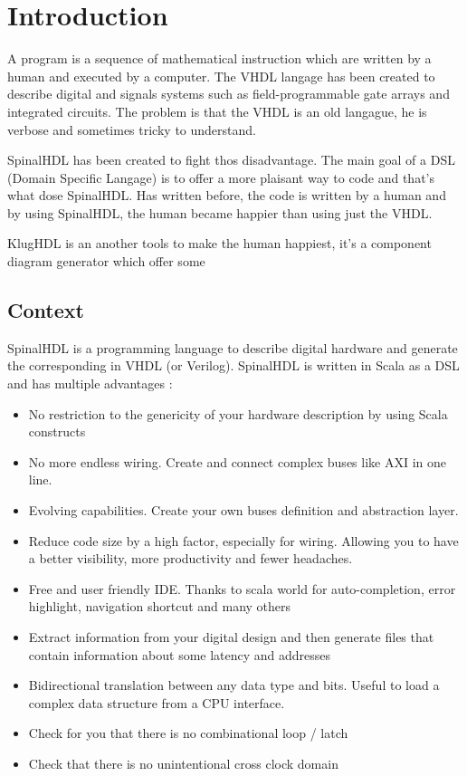 \chapter{Introduction} %
\label{cha:Introduction}

A program is a sequence of mathematical instruction which are written by a human and executed by a computer.
The VHDL langage has been created to describe digital and signals systems such as field-programmable gate arrays and integrated circuits\cite{wiki-vhdl}. The problem is that the VHDL is an old langague, he is verbose and sometimes tricky to understand.

SpinalHDL has been created to fight thos disadvantage. The main goal of a DSL (Domain Specific Langage) is to offer a more plaisant way to code and that's what dose SpinalHDL. Has written before, the code is written by a human and by using SpinalHDL, the human became happier than using just the VHDL.

KlugHDL is an another tools to make the human happiest, it's a component diagram generator which offer some

\section{Context} %
\label{sec:Context}

SpinalHDL is a programming language to describe digital hardware and generate the corresponding in VHDL (or Verilog). SpinalHDL is written in Scala as a DSL and has multiple advantages\cite{github-spinalhdl} :
\begin{itemize}
    \item No restriction to the genericity of your hardware description by using Scala constructs
    \item No more endless wiring. Create and connect complex buses like AXI in one line.
    \item Evolving capabilities. Create your own buses definition and abstraction layer.
    \item Reduce code size by a high factor, especially for wiring. Allowing you to have a better visibility, more productivity and fewer headaches.
    \item Free and user friendly IDE. Thanks to scala world for auto-completion, error highlight, navigation shortcut and many others
    \item Extract information from your digital design and then generate files that contain information about some latency and addresses
    \item Bidirectional translation between any data type and bits. Useful to load a complex data structure from a CPU interface.
    \item Check for you that there is no combinational loop / latch
    \item Check that there is no unintentional cross clock domain 
\end{itemize}


